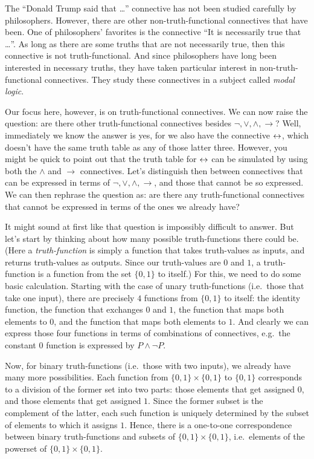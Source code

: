The ``Donald Trump said that \dots '' connective has not been studied
carefully by philosophers.  However, there are other
non-truth-functional connectives that have been.  One of philosophers'
favorites is the connective ``It is necessarily true that \dots ''.
As long as there are some truths that are not necessarily true, then
this connective is not truth-functional.  And since philosophers have
long been interested in necessary truths, they have taken particular
interest in non-truth-functional connectives.  They study these
connectives in a subject called \emph{modal logic}.

Our focus here, however, is on truth-functional connectives.  We can
now raise the question: are there other truth-functional connectives
besides $\neg ,\vee ,\wedge ,\to$?  Well, immediately we know the
answer is yes, for we also have the connective $\leftrightarrow$, which doesn't
have the same truth table as any of those latter three.  However, you
might be quick to point out that the truth table for $\leftrightarrow$ can be
simulated by using both the $\wedge$ and $\to$ connectives.  Let's
distinguish then between connectives that can be expressed in terms of
$\neg ,\vee ,\wedge ,\to$, and those that cannot be so expressed.  We
can then rephrase the question as: are there any truth-functional
connectives that cannot be expressed in terms of the ones we already
have?

It might sound at first like that question is impossibly difficult to
answer.  But let's start by thinking about how many possible
truth-functions there could be.  (Here a \emph{truth-function} is
simply a function that takes truth-values as inputs, and returns
truth-values as outputs.  Since our truth-values are $0$ and $1$, a
truth-function is a function from the set $\{ 0,1\}$ to itself.)  For
this, we need to do some basic calculation.  Starting with the case of
unary truth-functions (i.e.\ those that take one input), there are
precisely $4$ functions from $\{ 0,1\}$ to itself: the identity
function, the function that exchanges $0$ and $1$, the function that
maps both elements to $0$, and the function that maps both elements to
$1$.  And clearly we can express those four functions in terms of
combinations of connectives, e.g.\ the constant $0$ function is
expressed by $P\wedge\neg P$.

Now, for binary truth-functions (i.e.\ those with two inputs), we
already have many more possibilities.  Each function from
$\{ 0,1\}\times \{ 0,1\}$ to $\{ 0,1\}$ corresponds to a division of
the former set into two parts: those elements that get assigned $0$,
and those elements that get assigned $1$.  Since the former subset is
the complement of the latter, each such function is uniquely
determined by the subset of elements to which it assigns $1$.  Hence,
there is a one-to-one correspondence between binary truth-functions
and subsets of $\{ 0,1\}\times \{ 0,1\}$, i.e.\ elements of the
powerset of $\{ 0,1\}\times\{ 0,1\}$.

